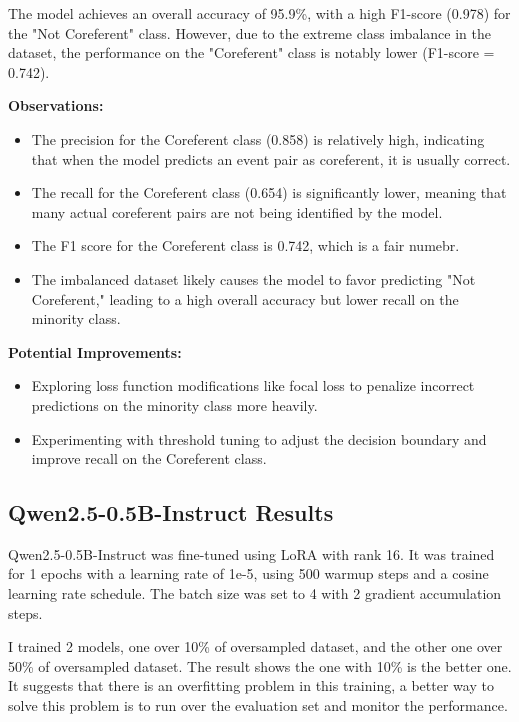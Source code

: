 \documentclass[12pt,a4paper]{article}
\begin{document}
The model achieves an overall accuracy of 95.9\%, with a high F1-score (0.978) for the "Not Coreferent" class. However, due to the extreme class imbalance in the dataset, the performance on the "Coreferent" class is notably lower (F1-score = 0.742).

\textbf{Observations:}
\begin{itemize}
    \item The precision for the Coreferent class (0.858) is relatively high, indicating that when the model predicts an event pair as coreferent, it is usually correct.
    \item The recall for the Coreferent class (0.654) is significantly lower, meaning that many actual coreferent pairs are not being identified by the model.
    \item The F1 score for the Coreferent class is 0.742, which is a fair numebr.
    \item The imbalanced dataset likely causes the model to favor predicting "Not Coreferent," leading to a high overall accuracy but lower recall on the minority class.
\end{itemize}

\textbf{Potential Improvements:}
\begin{itemize}
    \item Exploring loss function modifications like focal loss to penalize incorrect predictions on the minority class more heavily.
    \item Experimenting with threshold tuning to adjust the decision boundary and improve recall on the Coreferent class.
\end{itemize}

\subsection{Qwen2.5-0.5B-Instruct Results}

Qwen2.5-0.5B-Instruct was fine-tuned using LoRA with rank 16.
It was trained for 1 epochs with a learning rate of 1e-5, using 500 warmup
steps and a cosine learning rate schedule. The batch size was set to 4 with 2 gradient accumulation steps.

I trained 2 models, one over 10\% of oversampled dataset, and the other one over 50\% of oversampled dataset. The result shows the one with 10\% is the better one. It suggests that there is an overfitting problem in this training, a better way to solve this problem is to run over the evaluation set and monitor the performance.
\end{document}
